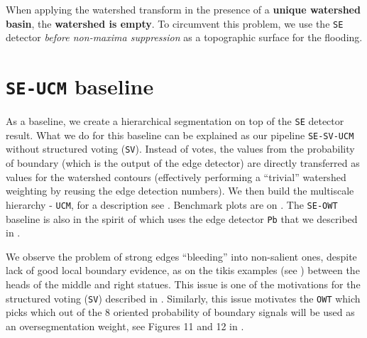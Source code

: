 When applying the watershed transform in the presence of a {\bf unique watershed basin}, %
the {\bf watershed is empty}. To circumvent this problem, we use the {\tt SE} detector {\it before non-maxima suppression} as a topographic surface for the flooding.

\section{{\tt SE-UCM} baseline}
\label{sec:ch5-SE-UCM-baseline}
As a baseline, we create a hierarchical segmentation %
on top of the {\tt SE} detector result. What we do for this baseline can %
be explained %
as our pipeline {\tt SE-SV-UCM} without structured voting ({\tt SV}). Instead of votes, the values from the probability of boundary (which is the output of the edge detector) are directly transferred as values for the watershed contours (effectively performing a ``trivial'' watershed weighting by reusing the edge detection numbers). %
We then build the multiscale hierarchy - {\tt UCM}, for a description see . Benchmark plots are on . The {\tt SE-OWT} baseline is also in the spirit of \cite{Arbelaez2006boundary} which uses %
the edge detector {\tt Pb} that we described in . 

We observe the problem of strong edges ``bleeding'' into non-salient ones, despite lack of good local boundary evidence, as on the tikis examples (see ) between the heads of the middle and right statues. This issue is one of the motivations for the structured voting ({\tt SV}) described in . Similarly, this issue motivates the {\tt OWT} which picks which out of the 8 oriented probability of boundary signals will be used as an oversegmentation weight, see Figures 11 and 12 in \cite{Arbelaez11}.

